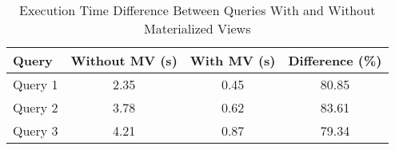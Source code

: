 \begin{table}[h!]
    \centering
    \begin{tabular}{@{}lccc@{}}
        \toprule
        \textbf{Query} & \textbf{Without MV (s)} & \textbf{With MV (s)} & \textbf{Difference (\%)} \\ \midrule
        Query 1        & 2.35                   & 0.45                 & 80.85                   \\
        Query 2        & 3.78                   & 0.62                 & 83.61                   \\
        Query 3        & 4.21                   & 0.87                 & 79.34                   \\ \bottomrule
    \end{tabular}
    \caption{Execution Time Difference Between Queries With and Without Materialized Views}
    \label{tab:performance}
\end{table}